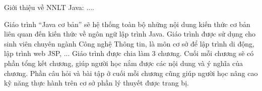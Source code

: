 Giới thiệu về NNLT Java: ....


Giáo trình “Java cơ bản” sẽ hệ thống toàn bộ những nội dung kiến thức cơ bản liên quan đến kiến thức về ngôn ngữ lập trình Java. Giáo trình được sử dụng cho sinh viên chuyên ngành Công nghệ Thông tin, là môn cơ sở để lập trình di động, lập trình web JSP, ... Giáo trình được chia làm 3 chương. Cuối mỗi chương sẽ có phần tổng kết chương, giúp người học nắm được các nội dung và ý nghĩa của chương. Phần câu hỏi và bài tập ở cuối mỗi chương cũng giúp người học nâng cao kỹ năng thực hành trên cơ sở phần lý thuyết được trang bị. 

